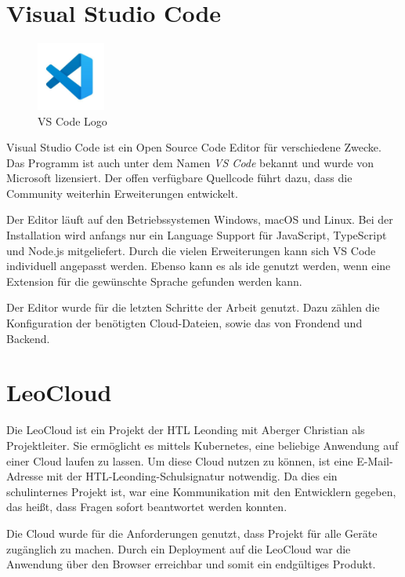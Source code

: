 \section{Visual Studio Code}
\label{ch::vsc}
\begin{figure}
  \begin{center}
      \includegraphics[width=0.2\textwidth]{pics/logos/vscode.jpg}
      \caption{VS Code Logo}
  \end{center}
\end{figure}
Visual Studio Code ist ein Open Source Code Editor für verschiedene Zwecke. 
Das Programm ist auch unter dem Namen \emph{VS Code} bekannt und wurde von Microsoft lizensiert. 
Der offen verfügbare Quellcode führt dazu, dass die Community weiterhin Erweiterungen entwickelt.
\cite{vscodeAbout}

Der Editor läuft auf den Betriebssystemen Windows, macOS und Linux. 
Bei der Installation wird anfangs nur ein Language Support für JavaScript, TypeScript und Node.js mitgeliefert. 
Durch die vielen Erweiterungen kann sich VS Code individuell angepasst werden. 
Ebenso kann es als \gls{ide} genutzt werden, wenn eine Extension für die gewünschte Sprache gefunden werden kann. 
\cite{vscodeAboutGs}

Der Editor wurde für die letzten Schritte der Arbeit genutzt. 
Dazu zählen die Konfiguration der benötigten Cloud-Dateien, sowie das von Frondend und Backend. 

\section{LeoCloud}
Die LeoCloud ist ein Projekt der HTL Leonding mit Aberger Christian als Projektleiter. 
Sie ermöglicht es mittels Kubernetes, eine beliebige Anwendung auf einer Cloud laufen zu lassen. 
Um diese Cloud nutzen zu können, ist eine E-Mail-Adresse mit der HTL-Leonding-Schulsignatur notwendig. 
Da dies ein schulinternes Projekt ist, war eine Kommunikation mit den Entwicklern gegeben, das heißt, dass Fragen sofort beantwortet werden konnten. 
\cite{LeoCloudAbout}

Die Cloud wurde für die Anforderungen genutzt, dass Projekt für alle Geräte zugänglich zu machen. 
Durch ein Deployment auf die LeoCloud war die Anwendung über den Browser erreichbar und somit ein endgültiges Produkt. 

